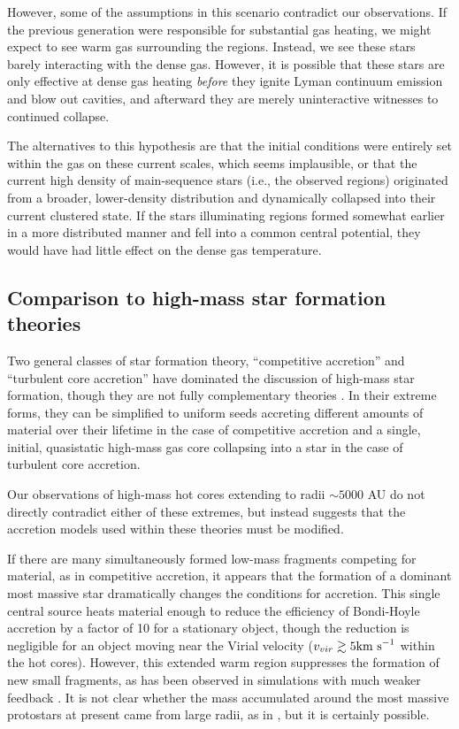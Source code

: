 \documentclass{aa}
\begin{document}
However, some of the assumptions in this scenario contradict our observations.
If the previous generation were responsible for substantial gas heating, we
might expect to see warm gas surrounding the \hchii regions.  Instead, we see
these stars barely interacting with the dense gas.  However, it is possible
that these stars are only effective at dense gas heating \emph{before} they ignite
Lyman continuum emission and blow out cavities, and afterward they are merely
uninteractive witnesses to continued collapse.

The alternatives to this hypothesis are that the initial conditions were
entirely set within the gas on these current scales, which seems implausible,
or that the current high density of main-sequence stars (i.e., the observed
\hchii regions) originated from a broader, lower-density distribution and
dynamically collapsed into their current clustered state.  If the
stars illuminating \hchii regions formed somewhat earlier in a more distributed
manner and fell into a common central potential, they would have had little
effect on the dense gas temperature.

\subsection{Comparison to high-mass star formation theories}
Two general classes of star formation theory, ``competitive accretion'' and
``turbulent core accretion'' have dominated the discussion of  high-mass star
formation, though they are
not fully complementary theories \citep{Schilke2016a}.  In their extreme forms,
they can be simplified to uniform seeds accreting different amounts of material
over their lifetime in the case of competitive accretion and a single, initial,
quasistatic high-mass gas core collapsing into a star in the case of turbulent
core accretion.

Our observations of high-mass hot cores extending to radii $\sim5000$ AU do
not directly contradict either of these extremes, but instead suggests
that the accretion models used within these theories must be modified.

If there are many simultaneously formed low-mass fragments competing for
material, as in competitive accretion, it appears that the formation of a
dominant most massive star dramatically changes the conditions for accretion.
This single central source heats material enough to reduce the efficiency of
Bondi-Hoyle accretion by a factor of 10 for a stationary object, though the
reduction is negligible for an object moving near the Virial velocity ($v_{vir}
\gtrsim 5 \textrm{km~s}^{-1}$ within the hot cores).  However, this extended warm region
suppresses the formation of new small fragments, as has been observed in simulations
with much weaker feedback \citep[e.g.][]{Bate2009a}. 
It is not clear whether the mass accumulated around the most massive protostars
at present came from large radii, as in \citet{Smith2009f}, but it is certainly
possible.
\end{document}
